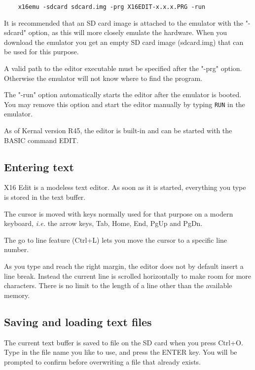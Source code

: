 \documentclass{article}
\begin{document}
\begin{verbatim}
    x16emu -sdcard sdcard.img -prg X16EDIT-x.x.x.PRG -run
\end{verbatim}
        It is recommended that an SD card image is attached to the
        emulator with the "-sdcard" option, as this will more closely emulate the hardware.
        When you download the emulator you get an empty SD card
        image (sdcard.img) that can be used for this purpose.
 
        A valid path to the editor executable must be specified after
        the "-prg" option. Otherwise the emulator will not know where
        to find the program.
 
        The "-run" option automatically starts the editor after the emulator
        is booted. You may remove this option and start the editor manually
        by typing \texttt{RUN} in the emulator.

        As of Kernal version R45, the editor is built-in and can be
        started with the BASIC command EDIT.
 
    \subsection{Entering text}
        X16 Edit is a modeless text editor. As soon as it is started, everything
        you type is stored in the text buffer.
 
        The cursor is moved with keys normally used for that purpose on a modern
        keyboard, \textit{i.e.} the arrow keys, Tab, Home, End, PgUp and PgDn.

        The go to line feature (Ctrl+L) lets you move the cursor to a specific line number.
 
        As you type and reach the right margin, the editor does not by default insert a line break. 
        Instead the current line is scrolled horizontally to
        make room for more characters. There is no limit to the length of a line
        other than the available memory.
 
    \subsection{Saving and loading text files}
        The current text buffer is saved to file on the SD card when you press Ctrl+O. Type in the 
        file name you like to use, and press the ENTER key. You will
        be prompted to confirm before overwriting a file that already exists.
         
\end{document}
